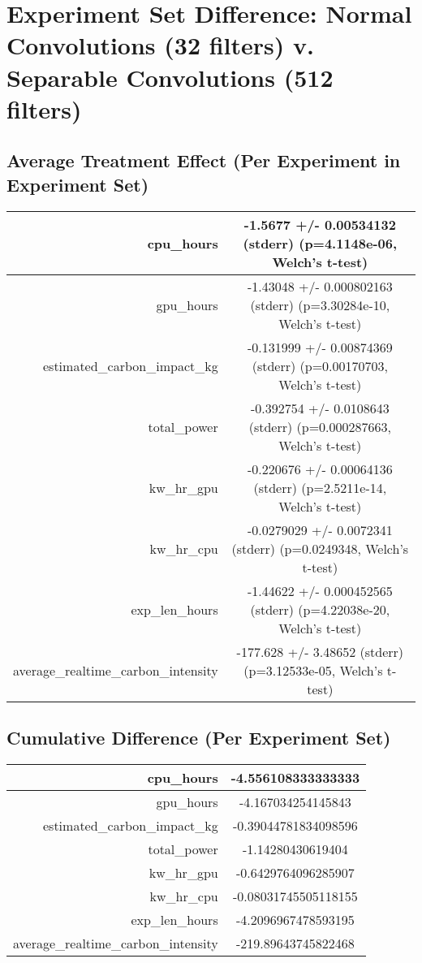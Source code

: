 \documentclass{article}%
\begin{document}
%
\normalsize%
\section{Experiment Set Difference: Normal Convolutions (32 filters) v. Separable Convolutions (512 filters)}%
\label{sec:Experiment Set Difference Normal Convolutions (32 filters) v. Separable Convolutions (512 filters)}%
\subsection{Average Treatment Effect (Per Experiment in Experiment Set)}%
\label{subsec:Average Treatment Effect (Per Experiment in Experiment Set)}%
\begin{tabular}{|r|c|}%
\hline%
cpu\_hours&{-}1.5677 +/{-} 0.00534132 (stderr) (p=4.1148e{-}06, Welch's t{-}test)\\%
\hline%
gpu\_hours&{-}1.43048 +/{-} 0.000802163 (stderr) (p=3.30284e{-}10, Welch's t{-}test)\\%
\hline%
estimated\_carbon\_impact\_kg&{-}0.131999 +/{-} 0.00874369 (stderr) (p=0.00170703, Welch's t{-}test)\\%
\hline%
total\_power&{-}0.392754 +/{-} 0.0108643 (stderr) (p=0.000287663, Welch's t{-}test)\\%
\hline%
kw\_hr\_gpu&{-}0.220676 +/{-} 0.00064136 (stderr) (p=2.5211e{-}14, Welch's t{-}test)\\%
\hline%
kw\_hr\_cpu&{-}0.0279029 +/{-} 0.0072341 (stderr) (p=0.0249348, Welch's t{-}test)\\%
\hline%
exp\_len\_hours&{-}1.44622 +/{-} 0.000452565 (stderr) (p=4.22038e{-}20, Welch's t{-}test)\\%
\hline%
average\_realtime\_carbon\_intensity&{-}177.628 +/{-} 3.48652 (stderr) (p=3.12533e{-}05, Welch's t{-}test)\\%
\hline%
\end{tabular}

%
\subsection{Cumulative Difference (Per Experiment Set)}%
\label{subsec:Cumulative Difference (Per Experiment Set)}%
\begin{tabular}{|r|c|}%
\hline%
cpu\_hours&{-}4.556108333333333\\%
\hline%
gpu\_hours&{-}4.167034254145843\\%
\hline%
estimated\_carbon\_impact\_kg&{-}0.39044781834098596\\%
\hline%
total\_power&{-}1.14280430619404\\%
\hline%
kw\_hr\_gpu&{-}0.6429764096285907\\%
\hline%
kw\_hr\_cpu&{-}0.08031745505118155\\%
\hline%
exp\_len\_hours&{-}4.2096967478593195\\%
\hline%
average\_realtime\_carbon\_intensity&{-}219.89643745822468\\%
\hline%
\end{tabular}

%
\end{document}
